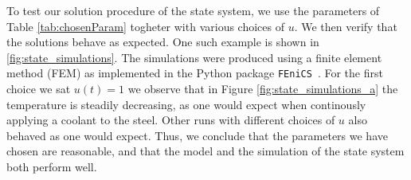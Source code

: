 To test our solution procedure of the state system, we use the parameters of Table \ref{tab:chosenParam} togheter with various choices of $u$. We then verify that the solutions behave as expected. One such example is shown in \ref{fig:state_simulations}. The simulations were produced using a finite element method (FEM) as implemented in the Python package \verb|FEniCS|~\cite{fenics}. For the first choice we sat $u(t) = 1$ we observe that in Figure \ref{fig:state_simulations_a} the temperature is steadily decreasing, as one would expect when continously applying a coolant to the steel. Other runs with different choices of $u$ also behaved as one would expect. Thus, we conclude that the parameters we have chosen are reasonable, and that the model and the simulation of the state system both perform well.
\begin{figure}
\end{figure}
